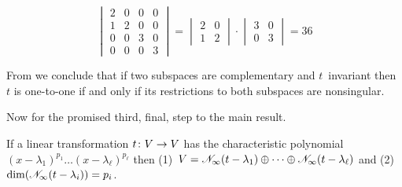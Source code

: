 \begin{example}
\begin{equation*}
    \begin{vmatrix}
       2  &0  &0  &0  \\
       1  &2  &0  &0  \\
       0  &0  &3  &0  \\
       0  &0  &0  &3
    \end{vmatrix}
   =\begin{vmatrix}
       2  &0  \\
       1  &2
    \end{vmatrix}
    \cdot
    \begin{vmatrix}
       3  &0  \\
       0  &3
    \end{vmatrix}
   =36
\end{equation*}
\end{example}

From  we conclude that
if two subspaces 
are complementary and \( t \)~invariant then
\( t \) is one-to-one if and only if its 
restrictions %
to both subspaces are nonsingular.

Now for the promised third, final, step to the main result.

\begin{lemma}
If a linear transformation \( \mbox{$t\colon V\to V$} \) has the 
characteristic polynomial
\( (x-\lambda_1)^{p_1}\dots(x-\lambda_\ell)^{p_\ell} \) then
(1)~\( V=\mathscr{N}_\infty(t-\lambda_1)\oplus\cdots
             \oplus\mathscr{N}_\infty(t-\lambda_\ell) \) 
and
(2)~\( \dim(\mathscr{N}_\infty(t-\lambda_i))=p_i  \).
\end{lemma}

